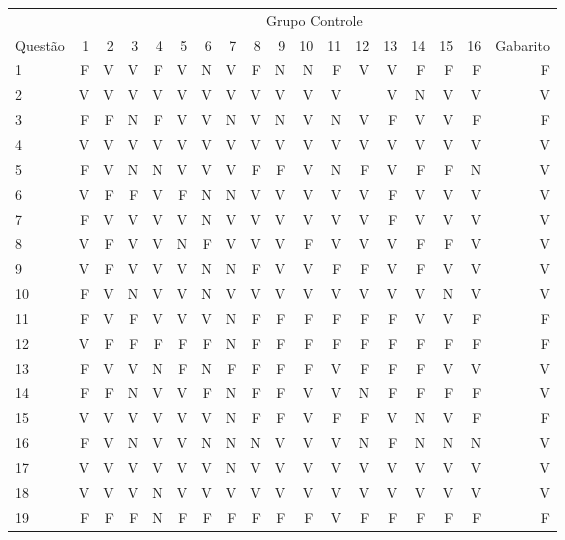 \begin{apendicesenv}
\begin{center}
	\begin{tabular}{ l r r r r r r r r r r r r r r r r r}
	\hline
	& \multicolumn{17}{c}{Grupo Controle}\\
	\cline{2 - 17} %
	\multirow[c]{-2}{*}{Questão} & 1 & 2 & 3 & 4 & 5 & 6 & 7 & 8 & 9 & 10 & 11 & 12 & 13 & 14 & 15 & 16 & Gabarito\\
	\hline
	1	&	F	&	V	&	V	&	F	&	V	&	N	&	V	&	F	&	N	&	N	&	F	&	V	&	V	&	F	&	F	&	F	&	F	\\
	2	&	V	&	V	&	V	&	V	&	V	&	V	&	V	&	V	&	V	&	V	&	V	&		&	V	&	N	&	V	&	V	&	V	\\
	3	&	F	&	F	&	N	&	F	&	V	&	V	&	N	&	V	&	N	&	V	&	N	&	V	&	F	&	V	&	V	&	F	&	F	\\
	4	&	V	&	V	&	V	&	V	&	V	&	V	&	V	&	V	&	V	&	V	&	V	&	V	&	V	&	V	&	V	&	V	&	V	\\
	5	&	F	&	V	&	N	&	N	&	V	&	V	&	V	&	F	&	F	&	V	&	N	&	F	&	V	&	F	&	F	&	N	&	V	\\
	6	&	V	&	F	&	F	&	V	&	F	&	N	&	N	&	V	&	V	&	V	&	V	&	V	&	F	&	V	&	V	&	V	&	V	\\
	7	&	F	&	V	&	V	&	V	&	V	&	N	&	V	&	V	&	V	&	V	&	V	&	V	&	F	&	V	&	V	&	V	&	V	\\
	8	&	V	&	F	&	V	&	V	&	N	&	F	&	V	&	V	&	V	&	F	&	V	&	V	&	V	&	F	&	F	&	V	&	V	\\
	9	&	V	&	F	&	V	&	V	&	V	&	N	&	N	&	F	&	V	&	V	&	F	&	F	&	V	&	F	&	V	&	V	&	V	\\
	10	&	F	&	V	&	N	&	V	&	V	&	N	&	V	&	V	&	V	&	V	&	V	&	V	&	V	&	V	&	N	&	V	&	V	\\
	11	&	F	&	V	&	F	&	V	&	V	&	V	&	N	&	F	&	F	&	F	&	F	&	F	&	F	&	V	&	V	&	F	&	F	\\
	12	&	V	&	F	&	F	&	F	&	F	&	F	&	N	&	F	&	F	&	F	&	F	&	F	&	F	&	F	&	F	&	F	&	F	\\
	13	&	F	&	V	&	V	&	N	&	F	&	N	&	F	&	F	&	F	&	F	&	V	&	F	&	F	&	F	&	V	&	V	&	V	\\
	14	&	F	&	F	&	N	&	V	&	V	&	F	&	N	&	F	&	F	&	V	&	V	&	N	&	F	&	F	&	F	&	F	&	V	\\
	15	&	V	&	V	&	V	&	V	&	V	&	V	&	N	&	F	&	F	&	V	&	F	&	F	&	V	&	N	&	V	&	F	&	F	\\
	16	&	F	&	V	&	N	&	V	&	V	&	N	&	N	&	N	&	V	&	V	&	V	&	N	&	F	&	N	&	N	&	N	&	V	\\
	17	&	V	&	V	&	V	&	V	&	V	&	V	&	N	&	V	&	V	&	V	&	V	&	V	&	V	&	V	&	V	&	V	&	V	\\
	18	&	V	&	V	&	V	&	N	&	V	&	V	&	V	&	V	&	V	&	V	&	V	&	V	&	V	&	V	&	V	&	V	&	V	\\
	19	&	F	&	F	&	F	&	N	&	F	&	F	&	F	&	F	&	F	&	F	&	V	&	F	&	F	&	F	&	F	&	F	&	F	\\

\end{tabular}
\end{center}
\end{apendicesenv}

